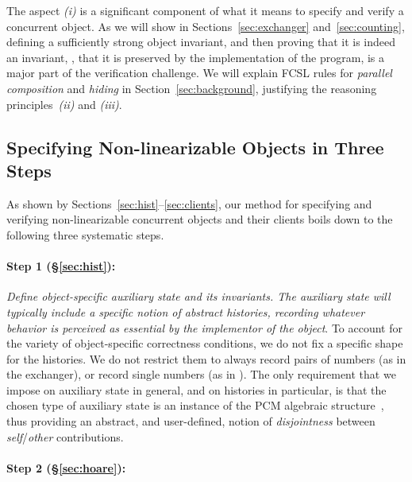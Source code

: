 The aspect \emph{(i)} is a significant component of what it means to
specify and verify a concurrent object. As we will show in
Sections~\ref{sec:exchanger} and~\ref{sec:counting}, defining a
sufficiently strong object invariant, and then proving that it is
indeed an invariant, \ie, that it is preserved by the implementation
of the program, is a major part of the verification challenge.
%
We will explain FCSL rules for \emph{parallel composition} and
\emph{hiding} in Section~\ref{sec:background}, justifying the
reasoning principles~\emph{(ii)} and \emph{(iii)}.

\subsection{Specifying Non-linearizable Objects in Three Steps}
\label{sec:three-steps-reas}

As shown by Sections~\ref{sec:hist}--\ref{sec:clients}, our method for
specifying and verifying non-linearizable concurrent objects and their
clients boils down to the following three systematic steps.

\paragraph{Step 1 (\S\ref{sec:hist}):} 

\emph{Define object-specific auxiliary state and its invariants. The
  auxiliary state will typically include a specific notion of abstract
  histories, recording whatever behavior is perceived as essential by
  the implementor of the object}.
%
%
To account for the variety of object-specific correctness conditions,
we do not fix a specific shape for the histories. We do not restrict
them to always record pairs of numbers (as in the exchanger), or
record single numbers (as in ). The only requirement that
we impose on auxiliary state in general, and on histories in
particular, is that the chosen type of auxiliary state is an instance
of the PCM algebraic structure~\cite{Sergey-al:ESOP15}, thus providing
an abstract, and user-defined, notion of \emph{disjointness} between
\emph{self}/\emph{other} contributions.

\paragraph{Step 2 (\S\ref{sec:hoare}):} 

